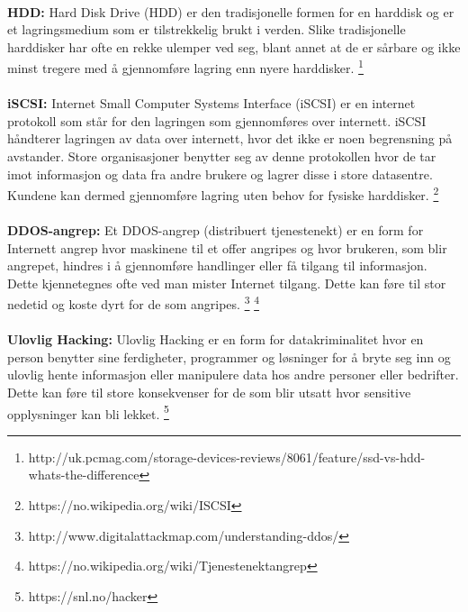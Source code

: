 \paragraph{} {\bfseries HDD:} Hard Disk Drive (HDD) er den tradisjonelle formen for en harddisk og er et lagringsmedium som er tilstrekkelig brukt i verden. Slike tradisjonelle harddisker har ofte en rekke ulemper ved seg, blant annet at de er sårbare og ikke minst tregere med å gjennomføre lagring enn nyere harddisker.
\footnote{http://uk.pcmag.com/storage-devices-reviews/8061/feature/ssd-vs-hdd-whats-the-difference}


\paragraph{} {\bfseries iSCSI:} Internet Small Computer Systems Interface (iSCSI) er en internet protokoll som står for den lagringen som gjennomføres over internett. iSCSI håndterer lagringen av data over internett, hvor det ikke er noen begrensning på avstander. Store organisasjoner benytter seg av denne protokollen hvor de tar imot informasjon og data fra andre brukere og lagrer disse i store datasentre. Kundene kan dermed gjennomføre lagring uten behov for fysiske harddisker.
\footnote{https://no.wikipedia.org/wiki/ISCSI}

\paragraph{} {\bfseries DDOS-angrep:} Et DDOS-angrep (distribuert tjenestenekt) er en form for Internett angrep hvor maskinene til et offer angripes og hvor brukeren, som blir angrepet, hindres i å gjennomføre handlinger eller få tilgang til informasjon. Dette kjennetegnes ofte ved man mister Internet tilgang. Dette kan føre til stor nedetid og koste dyrt for de som angripes.
\footnote{http://www.digitalattackmap.com/understanding-ddos/}
\footnote{https://no.wikipedia.org/wiki/Tjenestenektangrep}

\paragraph{} {\bfseries Ulovlig Hacking:} Ulovlig Hacking er en form for datakriminalitet hvor en person benytter sine ferdigheter, programmer og løsninger for å bryte seg inn og ulovlig hente informasjon eller manipulere data hos andre personer eller bedrifter. Dette kan føre til store konsekvenser for de som blir utsatt hvor sensitive opplysninger kan bli lekket. 
\footnote{https://snl.no/hacker}

